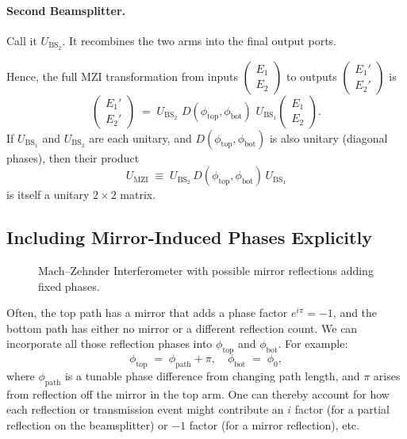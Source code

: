 \documentclass[12pt]{article}
\begin{document}
\paragraph{Second Beamsplitter.}
Call it $U_{\text{BS}_2}$.  It recombines the two arms into the final output ports.  

Hence, the full MZI transformation from inputs $\begin{pmatrix}E_1 \\ E_2\end{pmatrix}$ to outputs $\begin{pmatrix}E_1' \\ E_2'\end{pmatrix}$ is
\begin{equation}
\label{eq:U_MZI_def}
  \begin{pmatrix}
    E_1' \\[4pt]
    E_2'
  \end{pmatrix}
  \;=\;
  U_{\text{BS}_2}\,\,
  D(\phi_{\text{top}}, \phi_{\text{bot}})\,\,
  U_{\text{BS}_1}
  \begin{pmatrix}
    E_1 \\[3pt]
    E_2
  \end{pmatrix}.
\end{equation}
If $U_{\text{BS}_1}$ and $U_{\text{BS}_2}$ are each unitary, and $D(\phi_{\text{top}}, \phi_{\text{bot}})$ is also unitary (diagonal phases), then their product
\[
  U_{\text{MZI}}
  \;\equiv\;
  U_{\text{BS}_2}\,
  D(\phi_{\text{top}}, \phi_{\text{bot}})\,
  U_{\text{BS}_1}
\]
is itself a unitary $2\times 2$ matrix.

\subsection{Including Mirror-Induced Phases Explicitly}

\begin{figure}[ht]
\centering
{}
\caption{Mach--Zehnder Interferometer with possible mirror reflections adding fixed phases.}
\label{fig:MZI_mirror}
\end{figure}

Often, the top path has a mirror that adds a phase factor $e^{i\pi}=-1$, and the bottom path has either no mirror or a different reflection count.  We can incorporate all those reflection phases into $\phi_{\text{top}}$ and $\phi_{\text{bot}}$.  For example:
\[
  \phi_{\text{top}}
  \;=\;
  \phi_{\text{path}} + \pi,
  \quad
  \phi_{\text{bot}}
  \;=\;
  \phi_{0},
\]
where $\phi_{\text{path}}$ is a tunable phase difference from changing path length, and $\pi$ arises from reflection off the mirror in the top arm.  One can thereby account for how each reflection or transmission event might contribute an $i$ factor (for a partial reflection on the beamsplitter) or $-1$ factor (for a mirror reflection), etc.  
\end{document}
